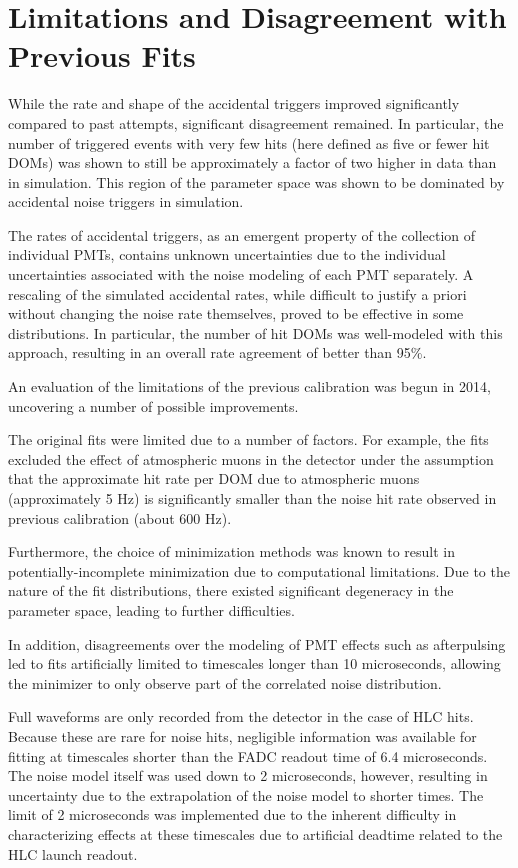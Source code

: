 \label{sec:vuvuzela_limitations}
\section{Limitations and Disagreement with Previous Fits}

While the rate and shape of the accidental triggers improved significantly compared to past attempts, significant disagreement remained.
In particular, the number of triggered events with very few hits (here defined as five or fewer hit DOMs) was shown to still be approximately a factor of two higher in data than in simulation.
This region of the parameter space was shown to be dominated by accidental noise triggers in simulation.

The rates of accidental triggers, as an emergent property of the collection of individual PMTs, contains unknown uncertainties due to the individual uncertainties associated with the noise modeling of each PMT separately.
A rescaling of the simulated accidental rates, while difficult to justify a priori without changing the noise rate themselves, proved to be effective in some distributions.
In particular, the number of hit DOMs was well-modeled with this approach, resulting in an overall rate agreement of better than 95\%. 

An evaluation of the limitations of the previous calibration was begun in 2014, uncovering a number of possible improvements.

The original fits were limited due to a number of factors. 
For example, the fits excluded the effect of atmospheric muons in the detector under the assumption that the approximate hit rate per DOM due to atmospheric muons (approximately 5 Hz) is significantly smaller than the noise hit rate observed in previous calibration (about 600 Hz).

Furthermore, the choice of minimization methods was known to result in potentially-incomplete minimization due to computational limitations.
Due to the nature of the fit distributions, there existed significant degeneracy in the parameter space, leading to further difficulties.

In addition, disagreements over the modeling of PMT effects such as afterpulsing led to fits artificially limited to timescales longer than 10 microseconds, allowing the minimizer to only observe part of the correlated noise distribution.

Full waveforms are only recorded from the detector in the case of HLC hits. 
Because these are rare for noise hits, negligible information was available for fitting at timescales shorter than the FADC readout time of 6.4 microseconds.
The noise model itself was used down to 2 microseconds, however, resulting in uncertainty due to the extrapolation of the noise model to shorter times.
The limit of 2 microseconds was implemented due to the inherent difficulty in characterizing effects at these timescales due to artificial deadtime related to the HLC launch readout. 

